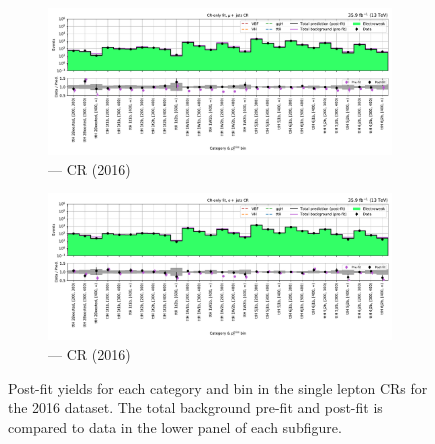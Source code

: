 \begin{figure}[htbp]
    \centering
    \begin{subfigure}[b]{\textwidth}
        \includegraphics[width=\textwidth]{chapters/higgstoinv/figures/mountain_ranges/2016/ttH/Wmunu_tree_fit_b-abs_values_ttH_cats.pdf}
        \caption{\ttH --- \singleMuCr \gls{CR} (2016)}
    \end{subfigure}

    \begin{subfigure}[b]{\textwidth}
        \includegraphics[width=\textwidth]{chapters/higgstoinv/figures/mountain_ranges/2016/ttH/Wenu_tree_fit_b-abs_values_ttH_cats.pdf}
        \caption{\ttH --- \singleEleCr \gls{CR} (2016)}
    \end{subfigure}
    \caption[Post-fit yields for each \ttH category and \ptmiss bin in the single lepton control regions for the 2016 dataset]{Post-fit yields for each \ttH category and \ptmiss bin in the single lepton \glspl{CR} for the 2016 dataset. The total background pre-fit and post-fit is compared to data in the lower panel of each subfigure.}
    \label{fig:htoinv_mountain_range_ttH_2016_single_lep_CRs}
\end{figure}

